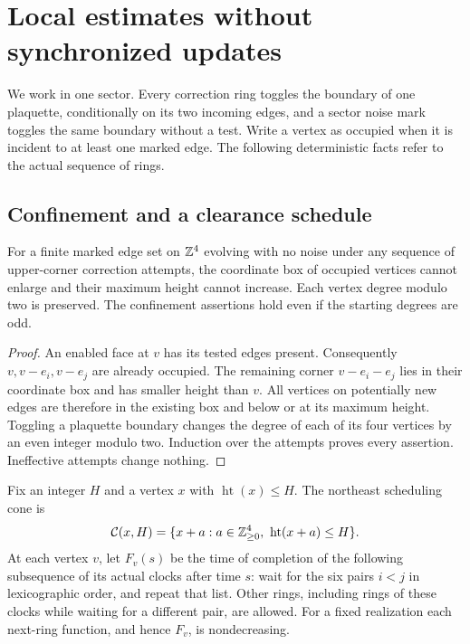\section{Local estimates without synchronized updates}\label{sec:local}

We work in one sector. Every correction ring toggles the boundary of
one plaquette, conditionally on its two incoming edges, and a sector
noise mark toggles the same boundary without a test. Write a vertex
as occupied when it is incident to at least one marked edge. The
following deterministic facts refer to the actual sequence of rings.

\subsection{Confinement and a clearance schedule}

\begin{lemma}\label{lem:confinement}
For a finite marked edge set on \(\mathbb Z^4\) evolving with no noise under
any sequence of upper-corner correction attempts, the coordinate box
of occupied vertices cannot enlarge and their maximum height cannot
increase. Each vertex degree modulo two is preserved. The confinement
assertions hold even if the starting degrees are odd.
\end{lemma}
\begin{proof}
An enabled face at \(v\) has its tested edges present. Consequently
\(v,v-e_i,v-e_j\) are already occupied. The remaining corner
\(v-e_i-e_j\) lies in their coordinate box and has smaller height than
\(v\). All vertices on potentially new edges are therefore in the
existing box and below or at its maximum height. Toggling a plaquette
boundary changes the degree of each of its four vertices by an even
integer modulo two. Induction over the attempts proves every
assertion. Ineffective attempts change nothing.
\end{proof}

Fix an integer \(H\) and a vertex \(x\) with
\(\operatorname{ht}(x)\le H\). The northeast scheduling cone is
\[
 \mathcal C(x,H)=\{x+a:a\in\mathbb Z_{\ge0}^4,\
                         \operatorname{ht}(x+a)\le H\}.
\]
At each vertex \(v\), let \(F_v(s)\) be the time of completion of the
following subsequence of its actual clocks after time \(s\): wait for
the six pairs \(i<j\) in lexicographic order, and repeat that list.
Other rings, including rings of these clocks while waiting for a
different pair, are allowed. For a fixed realization each next-ring
function, and hence \(F_v\), is nondecreasing.

